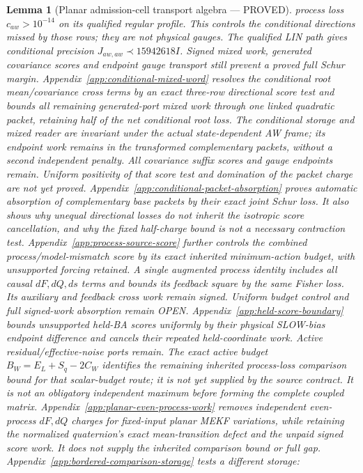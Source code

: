 \documentclass[journal]{IEEEtran}
\newtheorem{lemma}{Lemma}\newtheorem{theorem}{Theorem}\newtheorem{proposition}{Proposition}\newtheorem{remark}{Remark}\newtheorem{corollary}{Corollary}
\begin{document}
\begin{lemma}[Planar admission-cell transport algebra --- PROVED]
process loss $c_{aw}>10^{-14}$ on its qualified regular profile. This
controls the conditional directions missed by those rows; they are not
physical gauges. The qualified LIN path gives conditional precision
$J_{aw,aw}\prec15942618I$. Signed mixed work, generated covariance scores
and endpoint gauge transport still prevent a proved full Schur margin.
Appendix~\ref{app:conditional-mixed-word} resolves the conditional root
mean/covariance cross terms by an exact three-row directional score test and
bounds all remaining generated-port mixed work through one linked quadratic
packet, retaining half of the net conditional root loss. The conditional
storage and mixed reader are invariant under the actual state-dependent AW
frame; its endpoint work remains in the transformed complementary packets,
without a second independent penalty. All covariance suffix scores and gauge
endpoints remain. Uniform positivity of that
score test and domination of the packet charge are not yet proved.
Appendix~\ref{app:conditional-packet-absorption} proves automatic absorption
of complementary base packets by their exact joint Schur loss. It also shows
why unequal directional losses do not inherit the isotropic score cancellation,
and why the fixed half-charge bound is not a necessary contraction test.
Appendix~\ref{app:process-source-score} further controls the combined
process/model-mismatch score by its exact inherited minimum-action budget,
with unsupported forcing retained. A single augmented process identity
includes all causal $dF,dQ,ds$ terms and bounds its feedback square by the
same Fisher loss. Its auxiliary and feedback cross work remain signed.
Uniform budget control and full signed-work absorption remain OPEN.
Appendix~\ref{app:held-score-boundary} bounds unsupported held-BA scores
uniformly by their physical SLOW-bias endpoint difference and cancels their
repeated held-coordinate work. Active residual/effective-noise ports remain.
The exact active budget $B_W=E_L+S_q-2C_W$ identifies the remaining inherited
process-loss comparison bound for that scalar-budget route; it is not yet
supplied by the source contract. It is not an obligatory independent maximum
before forming the complete coupled matrix.
Appendix~\ref{app:planar-even-process-work} removes independent even-process
$dF,dQ$ charges for fixed-input planar MEKF variations, while retaining the
normalized quaternion's exact mean-transition defect and the unpaid signed
score work. It does not supply the inherited comparison bound or full gap.
Appendix~\ref{app:bordered-comparison-storage} tests a different storage:

\end{lemma}
\end{document}
